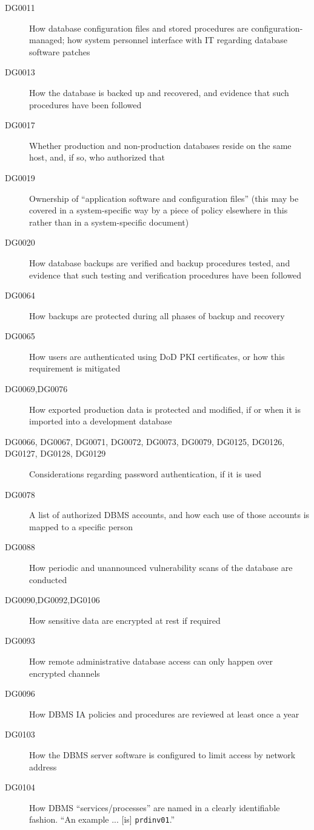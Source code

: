 \begin{description}
\item[DG0011] How database configuration files and stored procedures are
configuration-managed; how system personnel interface with IT regarding
database software patches
\item[DG0013] How the database is backed up and recovered, and evidence
that such procedures have been followed
\item[DG0017] Whether production and non-production databases reside on
the same host, and, if so, who authorized that
\item[DG0019] Ownership of ``application software and configuration
files'' (this may be covered in a system-specific way by a piece of policy
elsewhere in this \CMITSPolicy\, rather than in a system-specific
document)
\item[DG0020] How database backups are verified and backup procedures
tested, and evidence that such testing and verification procedures have
been followed
\item[DG0064] How backups are protected during all phases of backup and
recovery
\item[DG0065] How users are authenticated using DoD PKI certificates, or
how this requirement is mitigated
\item[DG0069,DG0076] How exported production data is protected and
modified, if or when it is imported into a development database
\item[DG0066, DG0067, DG0071, DG0072, DG0073, DG0079, DG0125, DG0126,
DG0127, DG0128, DG0129] Considerations regarding password authentication,
if it is used
\item[DG0078] A list of authorized DBMS accounts, and how each use of
those accounts is mapped to a specific person
\item[DG0088] How periodic and unannounced vulnerability scans of the
database are conducted
\item[DG0090,DG0092,DG0106] How sensitive data are encrypted at rest if required
\item[DG0093] How remote administrative database access can only happen
over encrypted channels
\item[DG0096] How DBMS IA policies and procedures are reviewed at least
once a year
\item[DG0103] How the DBMS server software is configured to limit access
by network address
\item[DG0104] How DBMS ``services/processes'' are named in a clearly
identifiable fashion. ``An example ... [is] \verb!prdinv01!.''

\end{description}
